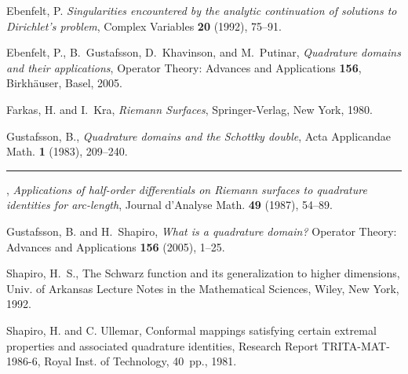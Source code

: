 \documentclass[12pt]{amsart}
\numberwithin{equation}{section}
\begin{document}
\begin{thebibliography}{000}
Ebenfelt, P.
{\em Singularities encountered by the analytic continuation of solutions to
Dirichlet's problem},
Complex Variables {\bf 20} (1992), 75--91.

Ebenfelt, P., B.~Gustafsson, D.~Khavinson, and M.~Putinar,
{\em Quadrature domains and their applications},
Operator Theory: Advances and Applications {\bf 156},
Birkh\"auser, Basel, 2005.

Farkas, H. and I.~Kra, {\it Riemann Surfaces}, Springer-Verlag, New York, 1980.

Gustafsson, B.,
{\em
Quadrature domains and the Schottky double},
Acta Applicandae Math.
{\bf 1} (1983), 209--240.

\rule{3em}{.5pt}\thinspace,
{\em
Applications of half-order differentials on Riemann surfaces
to quadrature identities for arc-length},
Journal d'Analyse Math.
{\bf 49} (1987), 54--89.

Gustafsson, B. and H.~Shapiro,
{\em
What is a quadrature domain?}
Operator Theory: Advances and Applications {\bf 156} (2005),
1--25.

Shapiro, H.~S.,
The Schwarz function and its generalization to higher dimensions,
Univ. of Arkansas Lecture Notes in the Mathematical Sciences,
Wiley, New York, 1992.

Shapiro, H. and C. Ullemar, Conformal mappings satisfying certain
extremal properties and associated quadrature identities, Research Report
TRITA-MAT-1986-6, Royal Inst. of Technology, 40~pp., 1981.

\end{thebibliography} 
\end{document}
